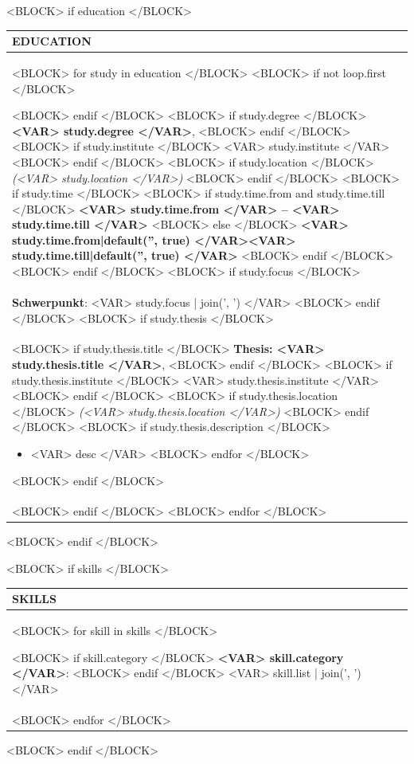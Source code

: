 \documentclass[<VAR> meta.fontsize|default('10pt', true) </VAR>]{extarticle}                %
\begin{document}
<BLOCK> if education </BLOCK>
\begin{tabularx}{\textwidth}{>{\raggedright\arraybackslash}X}

    \large\textbf{EDUCATION} \\
    \toprule[1pt]

    <BLOCK> for study in education </BLOCK>
        <BLOCK> if not loop.first </BLOCK>

        \toprule[0.5pt]
        <BLOCK> endif </BLOCK>
        <BLOCK> if study.degree </BLOCK>
        \textbf{<VAR> study.degree </VAR>}, 
        <BLOCK> endif </BLOCK>
        <BLOCK> if study.institute </BLOCK>
        <VAR> study.institute </VAR> 
        <BLOCK> endif </BLOCK>
        <BLOCK> if study.location </BLOCK>
        \textit{(<VAR> study.location </VAR>)} 
        <BLOCK> endif </BLOCK>
        <BLOCK> if study.time </BLOCK>
        <BLOCK> if study.time.from and study.time.till </BLOCK>
        \hfill \textbf{<VAR> study.time.from </VAR> – <VAR> study.time.till </VAR>}
        <BLOCK> else </BLOCK>
        \hfill \textbf{<VAR> study.time.from|default('', true) </VAR><VAR> study.time.till|default('', true) </VAR>}
        <BLOCK> endif </BLOCK>
        <BLOCK> endif </BLOCK>
        <BLOCK> if study.focus </BLOCK>
        \\
        \textbf{Schwerpunkt}: 
        <VAR> study.focus | join(', ') </VAR>
        <BLOCK> endif </BLOCK>
        <BLOCK> if study.thesis </BLOCK>
        \\
        <BLOCK> if study.thesis.title </BLOCK>
        \textbf{Thesis: <VAR> study.thesis.title </VAR>}, 
        <BLOCK> endif </BLOCK>
        <BLOCK> if study.thesis.institute </BLOCK>
        <VAR> study.thesis.institute </VAR> 
        <BLOCK> endif </BLOCK>
        <BLOCK> if study.thesis.location </BLOCK>
        \textit{(<VAR> study.thesis.location </VAR>)} 
        <BLOCK> endif </BLOCK>
        <BLOCK> if study.thesis.description </BLOCK>
        \begin{itemize}
        <BLOCK> for desc in study.thesis.description </BLOCK>
            \item <VAR> desc </VAR>
        <BLOCK> endfor </BLOCK>
        \end{itemize}
        <BLOCK> endif </BLOCK>
        \\
        <BLOCK> endif </BLOCK>
    <BLOCK> endfor </BLOCK>

\end{tabularx}
<BLOCK> endif </BLOCK>

<BLOCK> if skills </BLOCK>
\begin{tabularx}{\textwidth}{>{\raggedright\arraybackslash}X}

    \large\textbf{SKILLS} \\
    \toprule[1pt]
    <BLOCK> for skill in skills </BLOCK>

        <BLOCK> if skill.category </BLOCK>
        \textbf{<VAR> skill.category </VAR>}: 
        <BLOCK> endif </BLOCK>
        <VAR> skill.list | join(', ') </VAR>
        \\
    <BLOCK> endfor </BLOCK>

\end{tabularx}
<BLOCK> endif </BLOCK>
\end{document}
